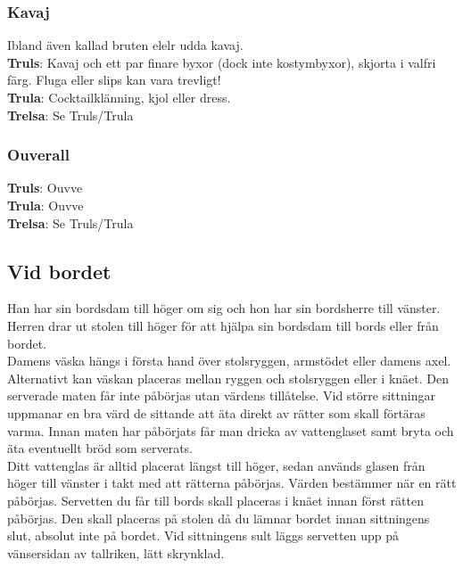 \subsubsection*{Kavaj}
Ibland även kallad bruten elelr udda kavaj.\\
\textbf{Truls}: Kavaj och ett par finare byxor (dock inte kostymbyxor), skjorta i valfri färg. Fluga eller slips kan vara trevligt!\\
\textbf{Trula}: Cocktailklänning, kjol eller dress.\\
\textbf{Trelsa}: Se Truls/Trula

\subsubsection*{Ouverall}
\textbf{Truls}: Ouvve\\
\textbf{Trula}: Ouvve\\
\textbf{Trelsa}: Se Truls/Trula


\newpage


\subsection*{Vid bordet}
Han har sin bordsdam till höger om sig och hon har sin bordsherre till vänster.
Herren drar ut stolen till höger för att hjälpa sin bordsdam till bords eller från bordet.
\\

Damens väska hängs i första hand över stolsryggen, armstödet eller damens axel.
Alternativt kan väskan placeras mellan ryggen och stolsryggen eller i knäet.
Den serverade maten får inte påbörjas utan värdens tillåtelse.
Vid större sittningar uppmanar en bra värd de sittande att äta direkt av rätter som skall förtäras varma.
Innan maten har påbörjats får man dricka av vattenglaset samt bryta och äta eventuellt bröd som serverats.
\\

Ditt vattenglas är alltid placerat längst till höger, sedan används glasen från höger till vänster i takt med att rätterna påbörjas.
Värden bestämmer när en rätt påbörjas.
Servetten du får till bords skall placeras i knäet innan först rätten påbörjas. Den skall placeras på stolen då du lämnar bordet innan sittningens slut, absolut inte på bordet.
Vid sittningens sult läggs servetten upp på vänsersidan av tallriken, lätt skrynklad.
\\



